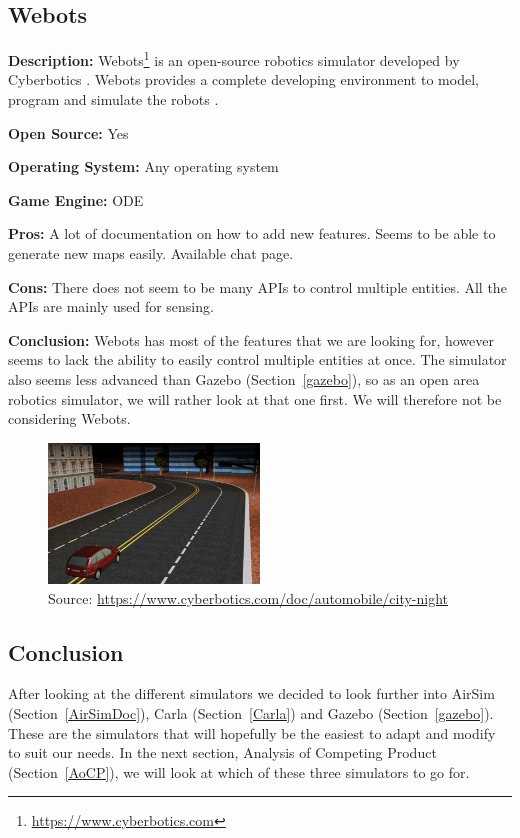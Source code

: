 \subsection{Webots}
\textbf{Description:} Webots\footnote{\url{https://www.cyberbotics.com}} is an open-source robotics simulator developed by Cyberbotics \cite{Webots_Github}. Webots provides a complete developing environment to model, program and simulate the robots \cite{Webots_home}. 

\textbf{Open Source:} Yes

\textbf{Operating System:} Any operating system

\textbf{Game Engine:} ODE

\textbf{Pros:} A lot of documentation on how to add new features. Seems to be able to generate new maps easily. Available chat page.

\textbf{Cons:} There does not seem to be many APIs to control multiple entities. All the APIs are mainly used for sensing. 

\textbf{Conclusion:} Webots has most of the features that we are looking for, however seems to lack the ability to easily control multiple entities at once. The simulator also seems less advanced than Gazebo (Section~\ref{gazebo}), so as an open area robotics simulator, we will rather look at that one first. We will therefore not be considering Webots.

\begin{figure}[H]
    \centering
    \includegraphics[width=0.5\textwidth]{Simulators/Webots.jpg}
    \caption{Source: \url{https://www.cyberbotics.com/doc/automobile/city-night}}
\end{figure}

\subsection{Conclusion}
After looking at the different simulators we decided to look further into AirSim (Section~\ref{AirSimDoc}), Carla (Section~\ref{Carla}) and Gazebo (Section~\ref{gazebo}). These are the simulators that will hopefully be the easiest to adapt and modify to suit our needs. In the next section, Analysis of Competing Product (Section~\ref{AoCP}), we will look at which of these three simulators to go for. 
